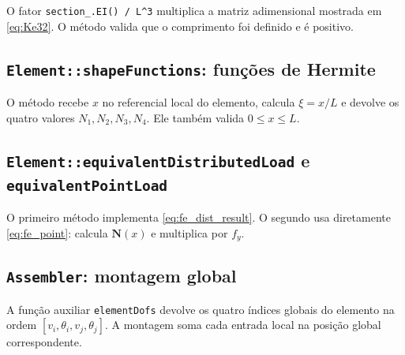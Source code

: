 \documentclass[12pt,a4paper]{article}
\begin{document}


O fator \texttt{section\_.EI() / L\^{}3} multiplica a matriz adimensional mostrada em \eqref{eq:Ke32}. O método valida que o comprimento foi definido e é positivo.

\subsection{\texttt{Element::shapeFunctions}: funções de Hermite}



O método recebe \(x\) no referencial local do elemento, calcula \(\xi=x/L\) e devolve os quatro valores \(N_1,N_2,N_3,N_4\). Ele também valida \(0\le x\le L\).

\subsection{\texttt{Element::equivalentDistributedLoad} e \texttt{equivalentPointLoad}}



O primeiro método implementa \eqref{eq:fe_dist_result}. O segundo usa diretamente \eqref{eq:fe_point}: calcula \(\mathbf{N}(x)\) e multiplica por \(f_y\).

\subsection{\texttt{Assembler}: montagem global}





A função auxiliar \texttt{elementDofs} devolve os quatro índices globais do elemento na ordem \([v_i,\theta_i,v_j,\theta_j]\). A montagem soma cada entrada local na posição global correspondente.
\end{document}
